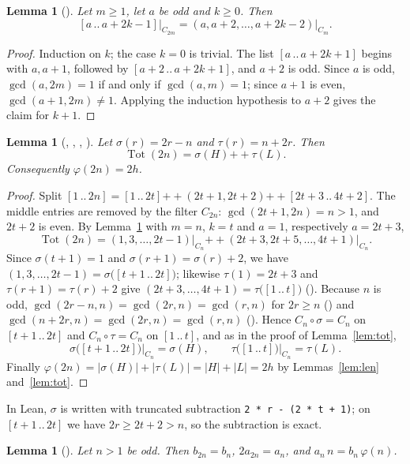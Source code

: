\documentclass[11pt]{amsart}
\theoremstyle{plain}
\newtheorem{lemma}[theorem]{Lemma}
\theoremstyle{definition}
\newcommand{\Tot}{\operatorname{Tot}}
\newcommand{\cat}{\mathbin{+\!\!+}}
\newcommand{\iv}[2]{[#1\,..\,#2]}
\begin{document}
\begin{lemma}[]\label{lem:pair}
Let $m\ge1$, let $a$ be odd and $k\ge0$. Then
\[
  \iv{a}{a+2k-1}\big|_{C_{2m}}=(a,a+2,\dots,a+2k-2)\big|_{C_m}.
\]
\end{lemma}

\begin{proof}
Induction on $k$; the case $k=0$ is trivial. The list $\iv{a}{a+2k+1}$ begins with $a,a+1$, followed by $\iv{a+2}{a+2k+1}$, and $a+2$ is odd. Since $a$ is odd, $\gcd(a,2m)=1$ if and only if $\gcd(a,m)=1$; since $a+1$ is even, $\gcd(a+1,2m)\ne1$. Applying the induction hypothesis to $a+2$ gives the claim for $k+1$.
\end{proof}

\begin{lemma}[, , , ]\label{lem:tot2}
Let $\sigma(r)=2r-n$ and $\tau(r)=n+2r$. Then
\[
  \Tot(2n)=\sigma(H)\cat\tau(L).
\]
Consequently $\varphi(2n)=2h$.
\end{lemma}

\begin{proof}
Split $\iv{1}{2n}=\iv{1}{2t}\cat(2t+1,2t+2)\cat\iv{2t+3}{4t+2}$. The middle entries are removed by the filter $C_{2n}$: $\gcd(2t+1,2n)=n>1$, and $2t+2$ is even. By Lemma~\ref{lem:pair} with $m=n$, $k=t$ and $a=1$, respectively $a=2t+3$,
\[
  \Tot(2n)=(1,3,\dots,2t-1)\big|_{C_n}\cat(2t+3,2t+5,\dots,4t+1)\big|_{C_n}.
\]
Since $\sigma(t+1)=1$ and $\sigma(r+1)=\sigma(r)+2$, we have $(1,3,\dots,2t-1)=\sigma\bigl(\iv{t+1}{2t}\bigr)$; likewise $\tau(1)=2t+3$ and $\tau(r+1)=\tau(r)+2$ give $(2t+3,\dots,4t+1)=\tau\bigl(\iv{1}{t}\bigr)$ ().
Because $n$ is odd, $\gcd(2r-n,n)=\gcd(2r,n)=\gcd(r,n)$ for $2r\ge n$ () and $\gcd(n+2r,n)=\gcd(2r,n)=\gcd(r,n)$ (). Hence $C_n\circ\sigma=C_n$ on $\iv{t+1}{2t}$ and $C_n\circ\tau=C_n$ on $\iv{1}{t}$, and as in the proof of Lemma~\ref{lem:tot},
\[
  \sigma\bigl(\iv{t+1}{2t}\bigr)\big|_{C_n}=\sigma(H),\qquad \tau\bigl(\iv{1}{t}\bigr)\big|_{C_n}=\tau(L).
\]
Finally $\varphi(2n)=|\sigma(H)|+|\tau(L)|=|H|+|L|=2h$ by Lemmas~\ref{lem:len} and~\ref{lem:tot}.
\end{proof}

In Lean, $\sigma$ is written with truncated subtraction \texttt{2 * r - (2 * t + 1)}; on $\iv{t+1}{2t}$ we have $2r\ge2t+2>n$, so the subtraction is exact.

\begin{lemma}[]\label{lem:frac}
Let $n>1$ be odd. Then $b_{2n}=b_n$, $2a_{2n}=a_n$, and $a_n\,n=b_n\,\varphi(n)$.
\end{lemma}
\end{document}
